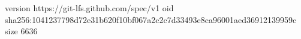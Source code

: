 version https://git-lfs.github.com/spec/v1
oid sha256:1041237798d72e31b620f10bf067a2c2c7d33493e8ca96001aed36912139959c
size 6636
